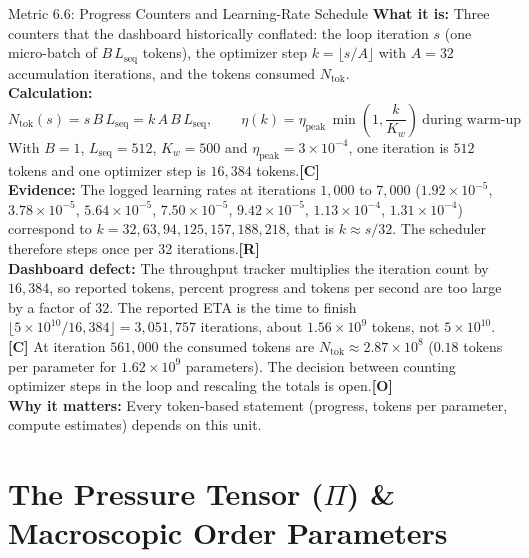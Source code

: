\documentclass[11pt,a4paper]{article}
\newcommand{\sR}{\textbf{[R]}}
\newcommand{\sC}{\textbf{[C]}}
\newcommand{\sO}{\textbf{[O]}}
\begin{document}
\begin{metricbox}{Metric 6.6: Progress Counters and Learning-Rate Schedule}
\textbf{What it is:} Three counters that the dashboard historically conflated: the loop iteration $s$ (one micro-batch of $B\,L_{\text{seq}}$ tokens), the optimizer step $k = \lfloor s/A \rfloor$ with $A = 32$ accumulation iterations, and the tokens consumed $N_{\text{tok}}$.\\
\textbf{Calculation:}
$$N_{\text{tok}}(s) = s\,B\,L_{\text{seq}} = k\,A\,B\,L_{\text{seq}}, \qquad \eta(k) = \eta_{\text{peak}}\,\min\!\left(1, \frac{k}{K_w}\right)\ \text{during warm-up}$$
With $B = 1$, $L_{\text{seq}} = 512$, $K_w = 500$ and $\eta_{\text{peak}} = 3\times10^{-4}$, one iteration is $512$ tokens and one optimizer step is $16{,}384$ tokens.\sC{}\\
\textbf{Evidence:} The logged learning rates at iterations $1{,}000$ to $7{,}000$ ($1.92\times10^{-5}$, $3.78\times10^{-5}$, $5.64\times10^{-5}$, $7.50\times10^{-5}$, $9.42\times10^{-5}$, $1.13\times10^{-4}$, $1.31\times10^{-4}$) correspond to $k = 32, 63, 94, 125, 157, 188, 218$, that is $k \approx s/32$. The scheduler therefore steps once per 32 iterations.\sR{}\\
\textbf{Dashboard defect:} The throughput tracker multiplies the iteration count by $16{,}384$, so reported tokens, percent progress and tokens per second are too large by a factor of $32$. The reported ETA is the time to finish $\lfloor 5\times10^{10}/16{,}384 \rfloor = 3{,}051{,}757$ iterations, about $1.56\times10^{9}$ tokens, not $5\times10^{10}$.\sC{} At iteration $561{,}000$ the consumed tokens are $N_{\text{tok}} \approx 2.87\times10^{8}$ ($0.18$ tokens per parameter for $1.62\times10^9$ parameters). The decision between counting optimizer steps in the loop and rescaling the totals is open.\sO{}\\
\textbf{Why it matters:} Every token-based statement (progress, tokens per parameter, compute estimates) depends on this unit.
\end{metricbox}

\section{The Pressure Tensor ($\Pi$) \& Macroscopic Order Parameters}
\end{document}
